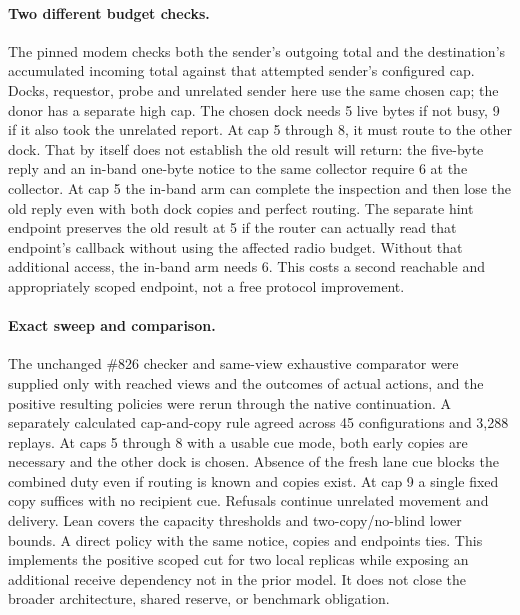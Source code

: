 \documentclass{article}
\begin{document}
\paragraph{Two different budget checks.}
The pinned modem checks both the sender's outgoing total and the destination's accumulated incoming total against that attempted sender's configured cap. Docks, requestor, probe and unrelated sender here use the same chosen cap; the donor has a separate high cap. The chosen dock needs 5 live bytes if not busy, 9 if it also took the unrelated report. At cap 5 through 8, it must route to the other dock. That by itself does not establish the old result will return: the five-byte reply and an in-band one-byte notice to the same collector require 6 at the collector. At cap 5 the in-band arm can complete the inspection and then lose the old reply even with both dock copies and perfect routing. The separate hint endpoint preserves the old result at 5 if the router can actually read that endpoint's callback without using the affected radio budget. Without that additional access, the in-band arm needs 6. This costs a second reachable and appropriately scoped endpoint, not a free protocol improvement.

\paragraph{Exact sweep and comparison.}
The unchanged \#826 checker and same-view exhaustive comparator were supplied only with reached views and the outcomes of actual actions, and the positive resulting policies were rerun through the native continuation. A separately calculated cap-and-copy rule agreed across 45 configurations and 3,288 replays. At caps 5 through 8 with a usable cue mode, both early copies are necessary and the other dock is chosen. Absence of the fresh lane cue blocks the combined duty even if routing is known and copies exist. At cap 9 a single fixed copy suffices with no recipient cue. Refusals continue unrelated movement and delivery. Lean covers the capacity thresholds and two-copy/no-blind lower bounds. A direct policy with the same notice, copies and endpoints ties. This implements the positive scoped cut for two local replicas while exposing an additional receive dependency not in the prior model. It does not close the broader architecture, shared reserve, or benchmark obligation.
\end{document}
